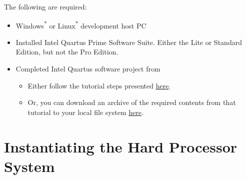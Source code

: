 \begin{flushleft}
\noindent
The following are required:

\begin{itemize}

\item Windows\textsuperscript{*} or Linux\textsuperscript{*} development host PC

\item Installed Intel\textsuperscript{\textregistered} Quartus\textsuperscript{\textregistered} Prime Software Suite.  Either the Lite or Standard Edition, but not the Pro Edition.

\item Completed Intel Quartus software project from 

\begin{itemize}

\item Either follow the tutorial steps presented \href{\TheReleasesURL/writeup_MyFirstQsysSystem.pdf}{\underline{here}}.

\item Or, you can download an archive of the required contents from that tutorial to your local file system \href{\TheReleasesURL/blink_for_MyFirstHPSSystem.zip}{\underline{here}}.

\end{itemize}

\end{itemize}

\end{flushleft}

\newpage

\section*{Instantiating the Hard Processor System}

